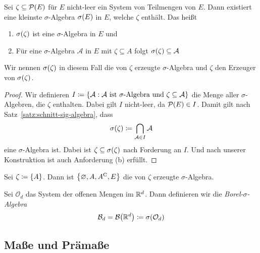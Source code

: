 \begin{satz} %
    Sei $\zeta \subseteq \mathcal{P}\of{E}$ für $E$ nicht-leer ein System von Teilmengen von $E$. Dann existiert eine kleinste $\sigma$-Algebra $\sigma\of{E}$ in $E$, welche $\zeta$ enthält. Das heißt
    \begin{enumerate}[label=(\alph*)]
        \item $\sigma\of{\zeta}$ ist eine $\sigma$-Algebra in $E$ und
        \item Für eine $\sigma$-Algebra $\mathcal{A}$ in $E$ mit $\zeta\subseteq A$ folgt $\sigma\of{\zeta} \subseteq \mathcal{A}$
    \end{enumerate}
    Wir nennen $\sigma\of{\zeta}$ in diesem Fall die von $\zeta$ erzeugte $\sigma$-Algebra und $\zeta$ den Erzeuger von $\sigma\of{\zeta}$.
    \begin{proof}
        Wir definieren $I \coloneqq \left\{\mathcal{A}: \mathcal{A} \text{ ist $\sigma$-Algebra und } \zeta\subseteq\mathcal{A}\right\}$ die Menge aller $\sigma$-Algebren, die $\zeta$ enthalten. Dabei gilt $I$ nicht-leer, da $\mathcal{P}\of{E}\in I$. Damit gilt nach Satz~\ref{satz:schnitt-sig-algebra}, dass
        \begin{align*}
            \sigma\of{\zeta} \coloneqq \bigcap_{\mathcal{A}\in I} \mathcal{A}
        \end{align*}
        eine $\sigma$-Algebra ist. Dabei ist $\zeta \subseteq \sigma\of{\zeta}$ nach Forderung an $I$. Und nach unserer Konstruktion ist auch Anforderung (b) erfüllt.
    \end{proof}
\end{satz}

\begin{beispiel}
    Sei $\zeta \coloneqq \left\{A\right\}$. Dann ist $\left\{\varnothing, A, {A}^{\mathrm{C}}, E\right\}$ die von $\zeta$ erzeugte $\sigma$-Algebra.
\end{beispiel}

\begin{definition}
    Sei $\mathcal{O}_d$ das System der offenen Mengen im $\mathbb{R}^d$. Dann definieren wir die \textit{Borel-$\sigma$-Algebra}
    \begin{align*}
        \mathcal{B}_d = \mathcal{B}\of{\R^d} \coloneqq \sigma\of{\mathcal{O}_d}
    \end{align*}
\end{definition}

\subsection{Maße und Prämaße}

